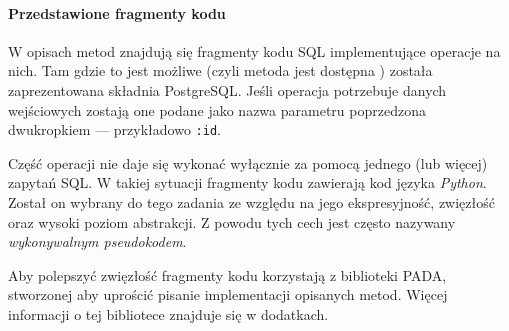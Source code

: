 \paragraph{Przedstawione fragmenty kodu} 
W opisach metod znajdują się fragmenty kodu SQL implementujące operacje na nich. 
Tam gdzie to jest możliwe (czyli metoda jest dostępna ) została zaprezentowana składnia PostgreSQL.
Jeśli operacja potrzebuje danych wejściowych zostają one podane jako nazwa parametru poprzedzona dwukropkiem --- przykładowo \texttt{:id}.



Część operacji nie daje się wykonać wyłącznie za pomocą jednego (lub więcej) zapytań SQL.
W takiej sytuacji fragmenty kodu zawierają kod języka \emph{Python}.
Został on wybrany do tego zadania ze względu na jego ekspresyjność, zwięzłość oraz wysoki poziom abstrakcji.
Z powodu tych cech jest często nazywany \emph{wykonywalnym pseudokodem}.

Aby polepszyć zwięzłość fragmenty kodu korzystają z biblioteki PADA, stworzonej aby uprościć pisanie implementacji opisanych metod. 
Więcej informacji o tej bibliotece znajduje się w dodatkach.








